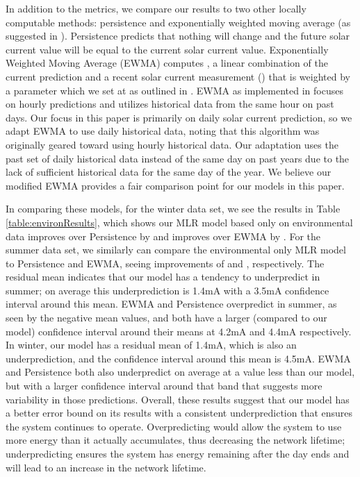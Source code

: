 \documentclass[prodmode,acmtosn]{acmsmall}
\begin{document}
In addition to the metrics, we compare our results to two other locally computable methods: persistence and exponentially weighted moving average (as suggested in \cite{hsuISPLED2006,kansalDAC2006}).
Persistence predicts that nothing will change and the future solar current value will be equal to the current solar current value.
Exponentially Weighted Moving Average (EWMA) computes \mbox{}, a linear combination of the current prediction and a recent solar current measurement () that is weighted by a parameter  which we set at  as outlined in \cite{hsuISPLED2006}.
EWMA as implemented in \cite{hsuISPLED2006,kansalDAC2006} focuses on hourly predictions and utilizes historical data from the same hour on past days.  Our focus in this paper is primarily on daily solar current prediction, so we    adapt EWMA  to use  daily  historical data, noting that this algorithm was originally geared toward using hourly historical data.  Our adaptation uses the past set of daily historical data instead of the same day on past years due to the lack of sufficient historical data for the same day of the year. We believe our modified EWMA provides a fair comparison point for our models in this paper.

In comparing these models, for the winter data set, we see the results in Table \ref{table:environResults}, which shows our MLR model based only on environmental data improves over Persistence by  and improves over EWMA by .
For the summer data set, we similarly can compare the environmental only MLR model to Persistence and EWMA, seeing improvements of  and , respectively.
The residual mean indicates that our model has a tendency to underpredict in summer; on average this underprediction is 1.4mA with a 3.5mA confidence interval around this mean.
EWMA and Persistence overpredict in summer, as seen by the negative mean values, and both have a larger (compared to our model) confidence interval around their means at 4.2mA and 4.4mA respectively.
In winter, our model has a residual mean of 1.4mA, which is also an underprediction, and the confidence interval around this mean is 4.5mA.
EWMA and Persistence both also underpredict on average at a value less than our model, but with a larger confidence interval around that band that suggests more variability in those predictions.
Overall, these results suggest that our model has a better error bound on its results with a consistent underprediction that ensures the system continues to operate.
Overpredicting would allow the system to use more energy than it actually accumulates, thus decreasing the network lifetime; underpredicting ensures the system has energy remaining after the day ends and will lead to an increase in the network lifetime.
\end{document}
